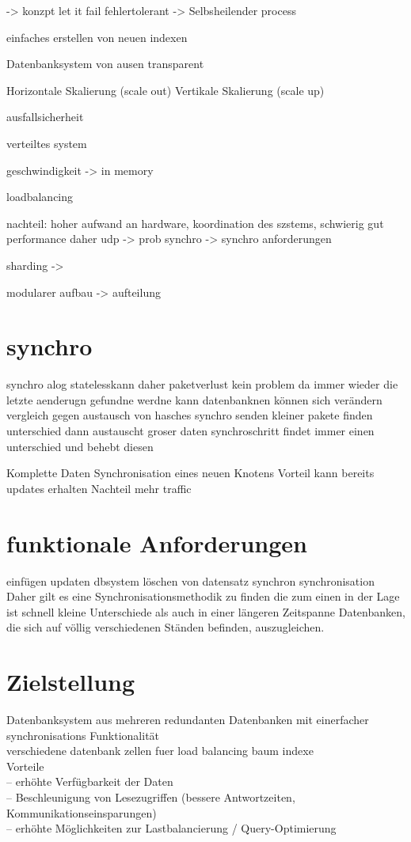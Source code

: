 \documentclass[a4paper,11pt,oneside,%
headsepline,												%
footsepline,												%
bibtotocnumbered									%
]{scrreprt}
\begin{document}
-> konzpt let it fail fehlertolerant 
-> Selbsheilender process

einfaches erstellen von neuen indexen

Datenbanksystem von ausen transparent

Horizontale Skalierung (scale out)  Vertikale Skalierung (scale up)

ausfallsicherheit

verteiltes system

geschwindigkeit -> in memory

loadbalancing

nachteil: hoher aufwand an hardware, koordination des szstems, schwierig gut performance daher udp -> prob synchro -> synchro anforderungen

sharding ->

modularer aufbau -> aufteilung 
\section{synchro}
synchro alog statelesskann daher paketverlust kein problem da immer wieder die letzte aenderugn gefundne werdne kann
datenbanknen können sich verändern
vergleich gegen austausch von hasches
synchro senden kleiner pakete finden unterschied dann austauscht groser daten
synchroschritt findet immer einen unterschied und behebt diesen

Komplette Daten Synchronisation eines neuen Knotens Vorteil kann bereits updates erhalten Nachteil mehr traffic
\section{funktionale Anforderungen}
einfügen
updaten
dbsystem löschen von datensatz synchron
synchronisation
Daher gilt es eine Synchronisationsmethodik zu finden die zum einen in der Lage ist schnell kleine Unterschiede als auch in einer längeren Zeitspanne Datenbanken, die sich auf völlig verschiedenen Ständen befinden, auszugleichen.

\section{Zielstellung}
Datenbanksystem aus mehreren redundanten Datenbanken mit einerfacher synchronisations Funktionalität\\

verschiedene datenbank zellen fuer load balancing
baum indexe\\

Vorteile\\
– erhöhte Verfügbarkeit der Daten\\
– Beschleunigung von Lesezugriffen (bessere Antwortzeiten,
Kommunikationseinsparungen)\\
– erhöhte Möglichkeiten zur Lastbalancierung / Query-Optimierung\\
\end{document}
